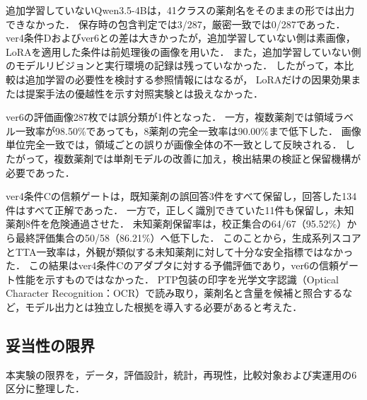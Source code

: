 \documentclass[uplatex,dvipdfmx]{jsarticle}
\begin{document}
追加学習していないQwen3.5-4Bは，41クラスの薬剤名をそのままの形では出力できなかった．
保存時の包含判定では3/287，厳密一致では0/287であった．
ver4条件Dおよびver6との差は大きかったが，追加学習していない側は素画像，LoRAを適用した条件は前処理後の画像を用いた．
また，追加学習していない側のモデルリビジョンと実行環境の記録は残っていなかった．
したがって，本比較は追加学習の必要性を検討する参照情報にはなるが，
LoRAだけの因果効果または提案手法の優越性を示す対照実験とは扱えなかった．

ver6の評価画像287枚では誤分類が1件となった．
一方，複数薬剤では領域ラベル一致率が98.50\%であっても，8薬剤の完全一致率は90.00\%まで低下した．
画像単位完全一致では，領域ごとの誤りが画像全体の不一致として反映される．
したがって，複数薬剤では単剤モデルの改善に加え，検出結果の検証と保留機構が必要であった．

ver4条件Cの信頼ゲートは，既知薬剤の誤回答3件をすべて保留し，回答した134件はすべて正解であった．
一方で，正しく識別できていた11件も保留し，未知薬剤8件を危険通過させた．
未知薬剤保留率は，校正集合の64/67（95.52\%）から最終評価集合の50/58（86.21\%）へ低下した．
このことから，生成系列スコアとTTA一致率は，外観が類似する未知薬剤に対して十分な安全指標ではなかった．
この結果はver4条件Cのアダプタに対する予備評価であり，ver6の信頼ゲート性能を示すものではなかった．
PTP包装の印字を光学文字認識（Optical Character Recognition：OCR）で読み取り，薬剤名と含量を候補と照合するなど，モデル出力とは独立した根拠を導入する必要があると考えた．

\subsection{妥当性の限界}

本実験の限界を，データ，評価設計，統計，再現性，比較対象および実運用の6区分に整理した．
\end{document}
